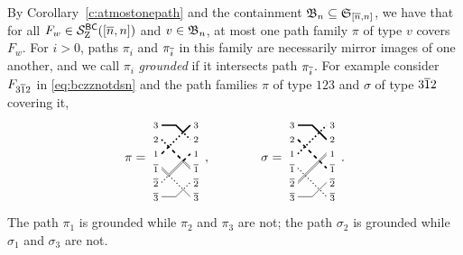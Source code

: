\documentclass[11pt]{article}
\theoremstyle{definition}
\numberwithin{equation}{section}
\begin{document}
By Corollary~\ref{c:atmostonepath} and the containment
$\mathfrak{B}_n \subseteq \mathfrak{S}_{\smash{[\overline{n}, n]}}$, we have that
for all $F_w \in \mathcal S^{\mathsf{BC}}_{\mathrm Z}([\overline{n} ,n])$ and $v \in \mathfrak{B}_n$,
at most one
path family $\pi$ of type $v$
covers $F_w$.
For $i>0$, paths $\pi_i$ and $\pi_{\overline{i}}$ in this family
are necessarily mirror
images of one another, and we call $\pi_i$
{\em grounded} if it intersects path $\pi_{\overline{i}}$.
For example consider $F_{3\overline{1}2}$ in \eqref{eq:bczznotdsn}
and the path families
$\pi$ of type $123$ and $\sigma$ of type $3\overline{1}2$ covering it,
\begin{equation}\label{eq:pisigma}
  \pi = 
\begin{tikzpicture}[scale=.4,baseline=0]%
  \node at (-.9,2.5) {$\scriptstyle 3$};
  \node at (-.9,1.5) {$\scriptstyle 2$};
  \node at (-.9,0.5) {$\scriptstyle 1$};
  \node at (1.9,2.5) {$\scriptstyle 3$};
  \node at (1.9,1.5) {$\scriptstyle 2$};
  \node at (1.9,0.5) {$\scriptstyle 1$};
  \node at (-.9,-2.5) {$\scriptstyle {\ol 3}$};
  \node at (-.9,-1.5) {$\scriptstyle {\ol 2}$};
  \node at (-.9,-0.5) {$\scriptstyle {\ol 1}$};
  \node at (1.9,-2.5) {$\scriptstyle {\ol 3}$};
  \node at (1.9,-1.5) {$\scriptstyle {\ol 2}$};
  \node at (1.9,-0.5) {$\scriptstyle {\ol 1}$};
  \draw[-, very thick]
  (-.5,2.5) -- (.5,2.5) -- (1,2) -- (1.5,2.5);
  \draw[-, dotted, very thick]
  (-.5,1.5) -- (0,1) -- (.5,1.5) -- (1,2) -- (1.5,1.5);
  \draw[-, dashed, very thick]
  (-.5,0.5) -- (0,1) -- (.5,0.5) -- (1,0) -- (1.5,0.5);
  \draw[-, thin]
  (-.5,-0.43) -- (0,-.93) -- (.5,-0.43) -- (1,0.07) -- (1.5,-0.43);
  \draw[-, thin]
  (-.5,-0.57) -- (0,-1.07) -- (.5,-0.57) -- (1,-0.07) -- (1.5,-0.57);
  \draw[-, dotted, thick]
  (-.5,-1.5) -- (0,-1) -- (.5,-1.5) -- (1,-2) -- (1.5,-1.5);
  \draw[-]
  (-.5,-2.5) -- (.5,-2.5) -- (1,-2) -- (1.5,-2.5);
\end{tikzpicture}\, ,
  \qquad \qquad
  \sigma = \begin{tikzpicture}[scale=.4,baseline=0]%
  \node at (-.9,2.5) {$\scriptstyle 3$};
  \node at (-.9,1.5) {$\scriptstyle 2$};
  \node at (-.9,0.5) {$\scriptstyle 1$};
  \node at (1.9,2.5) {$\scriptstyle 3$};
  \node at (1.9,1.5) {$\scriptstyle 2$};
  \node at (1.9,0.5) {$\scriptstyle 1$};
  \node at (-.9,-2.5) {$\scriptstyle {\ol 3}$};
  \node at (-.9,-1.5) {$\scriptstyle {\ol 2}$};
  \node at (-.9,-0.5) {$\scriptstyle {\ol 1}$};
  \node at (1.9,-2.5) {$\scriptstyle {\ol 3}$};
  \node at (1.9,-1.5) {$\scriptstyle {\ol 2}$};
  \node at (1.9,-0.5) {$\scriptstyle {\ol 1}$};
  \draw[-, very thick]
  (-.5,2.5) -- (.5,2.5) -- (1,2) -- (1.5,1.5);
  \draw[-, dotted, very thick]
  (-.5,0.5) -- (0,1) -- (.5,1.5) -- (1,2) -- (1.5,2.5);
  \draw[-, dashed, very thick]
  (-.5,1.5) -- (0,1) -- (.5,0.5) -- (1,0) -- (1.5,-0.5);
  \draw[-]
  (-.5,-2.5) -- (.5,-2.5) -- (1,-2) -- (1.5,-1.5);
  \draw[-, dotted, thick]
  (-.5,-0.5) -- (0,-1) -- (.5,-1.5) -- (1,-2) -- (1.5,-2.5);
  \draw[-, thin]
  (-.5,-1.43) -- (0,-.93) -- (.5,-0.43) -- (1,0.07) -- (1.5,0.57);
  \draw[-, thin]
  (-.5,-1.57) -- (0,-1.07) -- (.5,-0.57) -- (1,-.07) -- (1.5,0.43);
\end{tikzpicture}\, .
\end{equation}
The path $\pi_1$ is grounded while $\pi_2$ and $\pi_3$ are not;
the path $\sigma_2$ is grounded while $\sigma_1$ and $\sigma_3$ are not.
\end{document}
